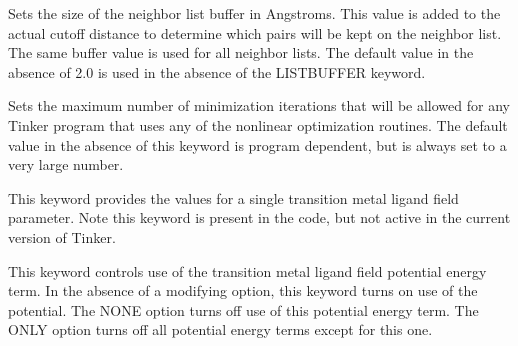 \documentclass[letterpaper,11pt,english]{sphinxmanual}
\begin{document}
  Sets the size of the neighbor list buffer in Angstroms. This value is added to the actual cutoff distance to determine which pairs will be kept on the neighbor list. The same buffer value is used for all neighbor lists. The default value in the absence of 2.0 is used in the absence of the LIST\sphinxhyphen{}BUFFER keyword.

  Sets the maximum number of minimization iterations that will be allowed for any Tinker program that uses any of the nonlinear optimization routines. The default value in the absence of this keyword is program dependent, but is always set to a very large number.

  This keyword provides the values for a single transition metal ligand field parameter. Note this keyword is present in the code, but not active in the current version of Tinker.

  This keyword controls use of the transition metal ligand field potential energy term. In the absence of a modifying option, this keyword turns on use of the potential. The NONE option turns off use of this potential energy term. The ONLY option turns off all potential energy terms except for this one.

















\end{document}

